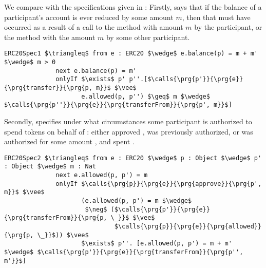 
\vspace{1cm}

We compare with the specifications given in \cite{OOPSLA22}:
 Firstly,  
says that if the balance of a participant's account is ever reduced by some amount $m$, then
that must have occurred as a result of a call to the  method with amount $m$ by the participant,
or the  method with the amount $m$ by some other participant.
\begin{lstlisting}[language = Chainmail, mathescape=true, frame=lines]
ERC20Spec1 $\triangleq$ from e : ERC20 $\wedge$ e.balance(p) = m + m' $\wedge$ m > 0
              next e.balance(p) = m'
              onlyIf $\exists$ p' p''.[$\calls{\prg{p'}}{\prg{e}}{\prg{transfer}}{\prg{p, m}}$ $\vee$ 
                     e.allowed(p, p'') $\geq$ m $\wedge$ $\calls{\prg{p''}}{\prg{e}}{\prg{transferFrom}}{\prg{p', m}}$]
\end{lstlisting}
Secondly,  specifies under what circumstances some participant  is authorized to 
spend  tokens on behalf of : either  approved ,  was previously authorized,
or  was authorized for some amount , and spent .
\begin{lstlisting}[language = Chainmail, mathescape=true, frame=lines]
ERC20Spec2 $\triangleq$ from e : ERC20 $\wedge$ p : Object $\wedge$ p' : Object $\wedge$ m : Nat
              next e.allowed(p, p') = m
              onlyIf $\calls{\prg{p}}{\prg{e}}{\prg{approve}}{\prg{p', m}}$ $\vee$ 
                     (e.allowed(p, p') = m $\wedge$ 
                      $\neg$ ($\calls{\prg{p'}}{\prg{e}}{\prg{transferFrom}}{\prg{p, \_}}$ $\vee$ 
                              $\calls{\prg{p}}{\prg{e}}{\prg{allowed}}{\prg{p, \_}}$)) $\vee$
                     $\exists$ p''. [e.allowed(p, p') = m + m' $\wedge$ $\calls{\prg{p'}}{\prg{e}}{\prg{transferFrom}}{\prg{p'', m'}}$]
\end{lstlisting}

